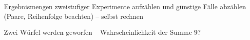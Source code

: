\begin{aufgabe}{Ergebnismengen zweistufiger Experimente aufzählen und günstige Fälle abzählen (Paare, Reihenfolge beachten) – selbst rechnen}
\begin{teile}
\teil Zwei Würfel werden geworfen – Wahrscheinlichkeit der Summe $9$?
\end{teile}
\end{aufgabe}
